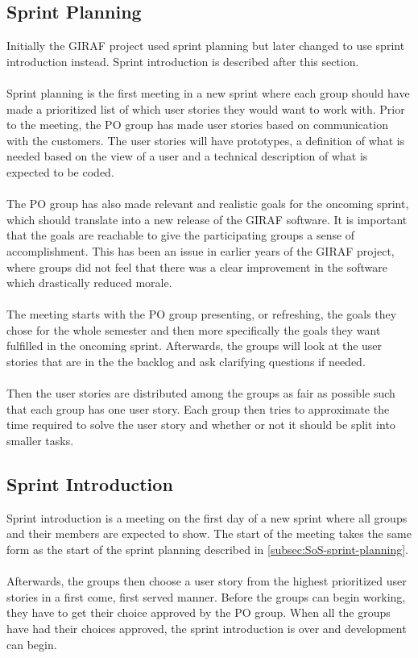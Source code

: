 \subsection{Sprint Planning} \label{subsec:SoS-sprint-planning}
Initially the GIRAF project used sprint planning but later changed to use sprint introduction instead.
Sprint introduction is described after this section.
\\
\\
Sprint planning is the first meeting in a new sprint where each group should have made a prioritized list of which user stories they would want to work with.
Prior to the meeting, the PO group has made user stories based on communication with the customers.
The user stories will have prototypes, a definition of what is needed based on the view of a user and a technical description of what is expected to be coded.
\\
\\
The PO group has also made relevant and realistic goals for the oncoming sprint, which should translate into a new release of the GIRAF software.
It is important that the goals are reachable to give the participating groups a sense of accomplishment.
This has been an issue in earlier years of the GIRAF project, where groups did not feel that there was a clear improvement in the software which drastically reduced morale.
\\
\\
The meeting starts with the PO group presenting, or refreshing, the goals they chose for the whole semester and then more specifically the goals they want fulfilled in the oncoming sprint.
Afterwards, the groups will look at the user stories that are in the the backlog and ask clarifying questions if needed.
\\
\\
Then the user stories are distributed among the groups as fair as possible such that each group has one user story.
Each group then tries to approximate the time required to solve the user story and whether or not it should be split into smaller tasks.

\subsection{Sprint Introduction} \label{subsec:SoS-sprint-introduction}
Sprint introduction is a meeting on the first day of a new sprint where all groups and their members are expected to show. 
The start of the meeting takes the same form as the start of the sprint planning described in \autoref{subsec:SoS-sprint-planning}.
\\
\\
Afterwards, the groups then choose a user story from the highest prioritized user stories in a first come, first served manner.
Before the groups can begin working, they have to get their choice approved by the PO group.
When all the groups have had their choices approved, the sprint introduction is over and development can begin.

